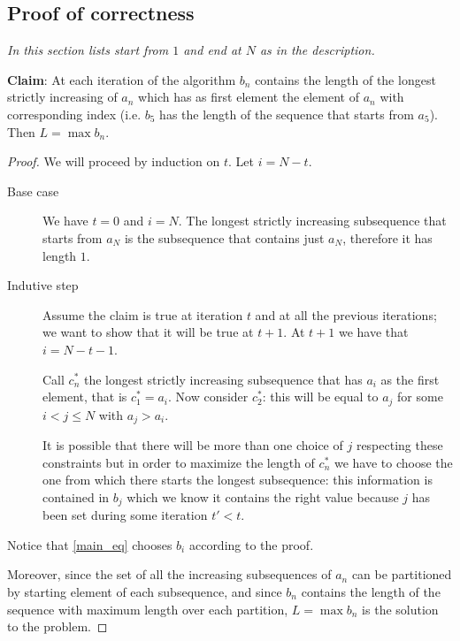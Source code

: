 \documentclass[12pt]{extarticle}
\numberwithin{table}{section}
\numberwithin{figure}{section}
\theoremstyle{definition}
\begin{document}
\subsection*{Proof of correctness}

\emph{In this section lists start from $1$ and end at $N$ as in the description.}

\textbf{Claim}: At each iteration of the algorithm $b_n$ contains the length of the longest strictly increasing of $a_n$ which has as first element the element of $a_n$ with corresponding index (i.e. $b_5$ has the length of the sequence that starts from $a_5$).
Then $L = \max b_n$.

\begin{proof}
    We will proceed by induction on $t$.
    Let $i = N - t$.
    \begin{description}
        \item[Base case] We have $t = 0$ and $i = N$. The longest strictly increasing subsequence that starts from $a_N$ is the subsequence that contains just $a_N$, therefore it has length $1$.
        \item[Indutive step] Assume the claim is true at iteration $t$ and at all the previous iterations; we want to show that it will be true at $t+1$. At $t+1$ we have that $i = N - t - 1$.

              Call $c^*_n$ the longest strictly increasing subsequence that has $a_i$ as the first element, that is $c^*_1 = a_i$.
              Now consider $c^*_2$: this will be equal to $a_j$ for some $i < j \leq N$ with $a_j > a_i$.

              It is possible that there will be more than one choice of $j$ respecting these constraints but in order to maximize the length of $c^*_n$ we have to choose the one from which there starts the longest subsequence: this information is contained in $b_j$ which we know it contains the right value because $j$ has been set during some iteration $t' < t$.
    \end{description}

    Notice that \autoref{main_eq} chooses $b_i$ according to the proof.

    Moreover, since the set of all the increasing subsequences of $a_n$ can be partitioned by starting element of each subsequence, and since $b_n$ contains the length of the sequence with maximum length over each partition, $L = \max b_n$ is the solution to the problem.
\end{proof}
\end{document}
